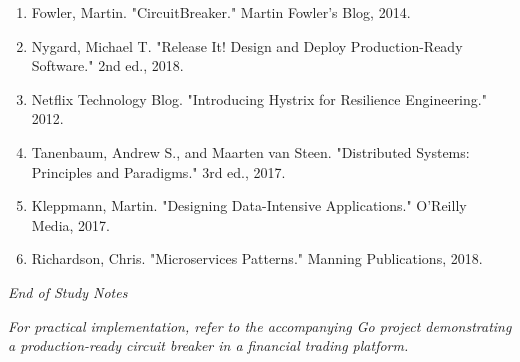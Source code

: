 \documentclass[12pt,a4paper]{article}
\begin{document}
\begin{enumerate}
    \item Fowler, Martin. "CircuitBreaker." Martin Fowler's Blog, 2014.
    \item Nygard, Michael T. "Release It! Design and Deploy Production-Ready Software." 2nd ed., 2018.
    \item Netflix Technology Blog. "Introducing Hystrix for Resilience Engineering." 2012.
    \item Tanenbaum, Andrew S., and Maarten van Steen. "Distributed Systems: Principles and Paradigms." 3rd ed., 2017.
    \item Kleppmann, Martin. "Designing Data-Intensive Applications." O'Reilly Media, 2017.
    \item Richardson, Chris. "Microservices Patterns." Manning Publications, 2018.
\end{enumerate}

\vspace{1cm}

\begin{center}
\textit{End of Study Notes}

\textit{For practical implementation, refer to the accompanying Go project demonstrating a production-ready circuit breaker in a financial trading platform.}
\end{center}
\end{document}
